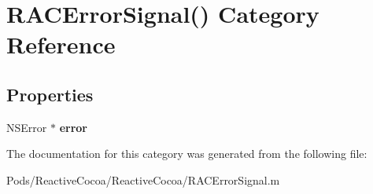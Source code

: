 \hypertarget{category_r_a_c_error_signal_07_08}{}\section{R\+A\+C\+Error\+Signal() Category Reference}
\label{category_r_a_c_error_signal_07_08}
\subsection*{Properties}
\begin{DoxyCompactItemize}
\item 
\mbox{\label{category_r_a_c_error_signal_07_08_a194d351341a9f990d828dc87b3549c0d}} 
N\+S\+Error $\ast$ {\bfseries error}
\end{DoxyCompactItemize}


The documentation for this category was generated from the following file\+:\begin{DoxyCompactItemize}
\item 
Pods/\+Reactive\+Cocoa/\+Reactive\+Cocoa/R\+A\+C\+Error\+Signal.\+m\end{DoxyCompactItemize}
